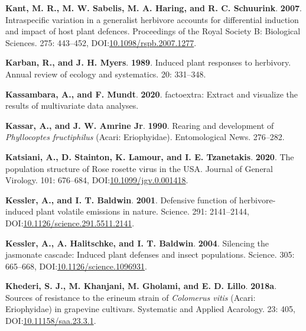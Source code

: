 \documentclass[12pt,final,CPage]{ufthesis}
\newlength{\cslhangindent}
\newenvironment{CSLReferences}[2] %
{%
	\setlength{\parindent}{0pt}
	\ifodd #1 \everypar{\setlength{\hangindent}{\cslhangindent}}\ignorespaces\fi
	\ifnum #2 > 0
	\setlength{\parskip}{#2\baselineskip}
	\fi
}%
{}
\begin{document}
{\begin{CSLReferences}{1}{0}
  \leavevmode{}%
  \textbf{Kant, M. R., M. W. Sabelis, M. A. Haring, and R. C. Schuurink}. \textbf{2007}. Intraspecific variation in a generalist herbivore accounts for differential induction and impact of host plant defences. Proceedings of the Royal Society B: Biological Sciences. 275: 443--452, DOI:\href{https://doi.org/10.1098/rspb.2007.1277}{10.1098/rspb.2007.1277}.

  \leavevmode{}%
  \textbf{Karban, R., and J. H. Myers}. \textbf{1989}. Induced plant responses to herbivory. Annual review of ecology and systematics. 20: 331--348.

  \leavevmode{}%
  \textbf{Kassambara, A., and F. Mundt}. \textbf{2020}. {factoextra}: Extract and visualize the results of multivariate data analyses.

  \leavevmode{}%
  \textbf{Kassar, A., and J. W. Amrine Jr}. \textbf{1990}. Rearing and development of {\emph{Phyllocoptes fructiphilus}} ({Acari}: {Eriophyidae}). Entomological News. 276--282.

  \leavevmode{}%
  \textbf{Katsiani, A., D. Stainton, K. Lamour, and I. E. Tzanetakis}. \textbf{2020}. The population structure of {Rose rosette virus} in the {USA}. Journal of General Virology. 101: 676--684, DOI:\href{https://doi.org/10.1099/jgv.0.001418}{10.1099/jgv.0.001418}.

  \leavevmode{}%
  \textbf{Kessler, A., and I. T. Baldwin}. \textbf{2001}. Defensive function of herbivore-induced plant volatile emissions in nature. Science. 291: 2141--2144, DOI:\href{https://doi.org/10.1126/science.291.5511.2141}{10.1126/science.291.5511.2141}.

  \leavevmode{}%
  \textbf{Kessler, A., A. Halitschke, and I. T. Baldwin}. \textbf{2004}. Silencing the jasmonate cascade: Induced plant defenses and insect populations. Science. 305: 665--668, DOI:\href{https://doi.org/10.1126/science.1096931}{10.1126/science.1096931}.

  \leavevmode{}%
  \textbf{Khederi, S. J., M. Khanjani, M. Gholami, and E. D. Lillo}. \textbf{2018a}. Sources of resistance to the erineum strain of {\emph{Colomerus vitis}} ({Acari}: {Eriophyidae}) in grapevine cultivars. Systematic and Applied Acarology. 23: 405, DOI:\href{https://doi.org/10.11158/saa.23.3.1}{10.11158/saa.23.3.1}.


\end{CSLReferences}}
\end{document}

